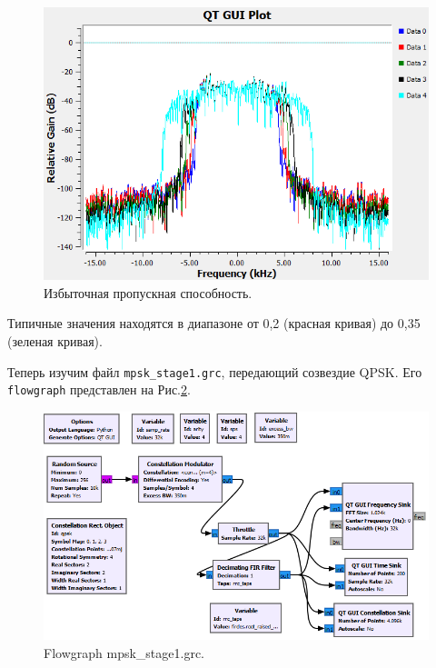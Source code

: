 \documentclass[a4paper, 14pt]{extarticle}
\begin{document}
    \begin{figure}[H]
        \centering
        \includegraphics[width=0.8\linewidth]{resources/Images/task1_excess_bandwidth}
        \caption{Избыточная пропускная способность.}
        \label{fig:task1_excess_bandwidth}
    \end{figure}

    Типичные значения находятся в диапазоне от 0,2 (красная кривая) до 0,35 (зеленая кривая).

    Теперь изучим файл \texttt{mpsk\_stage1.grc}, передающий созвездие QPSK.
    Его \texttt{flowgraph} представлен на Рис.\ref{fig:task1_mpsk_stage1}.

    \begin{figure}[h]
        \centering
        \includegraphics[width=0.8\linewidth]{resources/Images/task1_mpsk_stage1}
        \caption{Flowgraph mpsk\_stage1.grc.}
        \label{fig:task1_mpsk_stage1}
    \end{figure}
\end{document}
